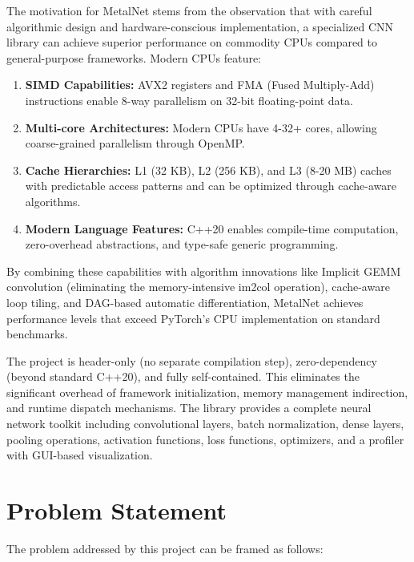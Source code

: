 \documentclass[12pt,oneside,a4paper]{report}
\begin{document}
The motivation for MetalNet stems from the observation that with careful algorithmic design and hardware-conscious implementation, a specialized CNN library can achieve superior performance on commodity CPUs compared to general-purpose frameworks. Modern CPUs feature:

\begin{enumerate}
    \item \textbf{SIMD Capabilities:} AVX2 registers and FMA (Fused Multiply-Add) instructions enable 8-way parallelism on 32-bit floating-point data.
    \item \textbf{Multi-core Architectures:} Modern CPUs have 4-32+ cores, allowing coarse-grained parallelism through OpenMP.
    \item \textbf{Cache Hierarchies:} L1 (32 KB), L2 (256 KB), and L3 (8-20 MB) caches with predictable access patterns and can be optimized through cache-aware algorithms.
    \item \textbf{Modern Language Features:} C++20 enables compile-time computation, zero-overhead abstractions, and type-safe generic programming.
\end{enumerate}

By combining these capabilities with algorithm innovations like Implicit GEMM convolution (eliminating the memory-intensive im2col operation), cache-aware loop tiling, and DAG-based automatic differentiation, MetalNet achieves performance levels that exceed PyTorch's CPU implementation on standard benchmarks.

The project is header-only (no separate compilation step), zero-dependency (beyond standard C++20), and fully self-contained. This eliminates the significant overhead of framework initialization, memory management indirection, and runtime dispatch mechanisms. The library provides a complete neural network toolkit including convolutional layers, batch normalization, dense layers, pooling operations, activation functions, loss functions, optimizers, and a profiler with GUI-based visualization.

\section{Problem Statement}

The problem addressed by this project can be framed as follows:
\end{document}
